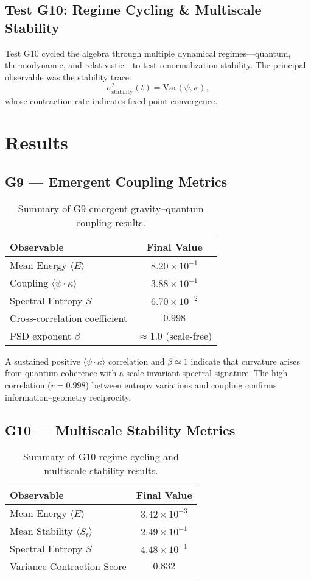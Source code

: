 \documentclass[12pt,a4paper]{article}
\begin{document}
\subsection{Test G10: Regime Cycling \& Multiscale Stability}
Test G10 cycled the algebra through multiple dynamical regimes—quantum, thermodynamic, and relativistic—to test renormalization stability.  
The principal observable was the stability trace:
\[
\sigma^2_\text{stability}(t) = \mathrm{Var}(\psi, \kappa),
\]
whose contraction rate indicates fixed-point convergence.

\section{Results}

\subsection{G9 — Emergent Coupling Metrics}
\begin{table}[h]
\centering
\begin{tabular}{l c}
\toprule
Observable & Final Value \\
\midrule
Mean Energy $\langle E \rangle$ & $8.20\times10^{-1}$ \\
Coupling $\langle \psi\cdot\kappa \rangle$ & $3.88\times10^{-1}$ \\
Spectral Entropy $S$ & $6.70\times10^{-2}$ \\
Cross-correlation coefficient & $0.998$ \\
PSD exponent $\beta$ & $\approx 1.0$ (scale-free) \\
\bottomrule
\end{tabular}
\caption{Summary of G9 emergent gravity--quantum coupling results.}
\end{table}

A sustained positive $\langle \psi\cdot\kappa \rangle$ correlation and $\beta\simeq1$ indicate that curvature arises from quantum coherence with a scale-invariant spectral signature.  
The high correlation ($r=0.998$) between entropy variations and coupling confirms information–geometry reciprocity.

\subsection{G10 — Multiscale Stability Metrics}
\begin{table}[h]
\centering
\begin{tabular}{l c}
\toprule
Observable & Final Value \\
\midrule
Mean Energy $\langle E \rangle$ & $3.42\times10^{-3}$ \\
Mean Stability $\langle S_t \rangle$ & $2.49\times10^{-1}$ \\
Spectral Entropy $S$ & $4.48\times10^{-1}$ \\
Variance Contraction Score & $0.832$ \\
\bottomrule
\end{tabular}
\caption{Summary of G10 regime cycling and multiscale stability results.}
\end{table}
\end{document}
